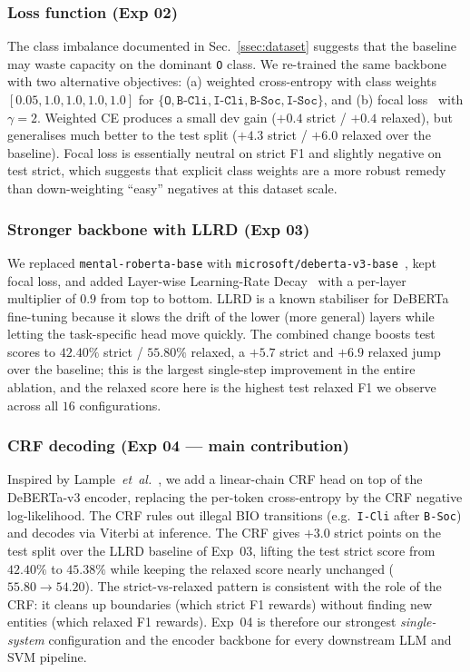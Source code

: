 \documentclass[journal]{IEEEtran}
\begin{document}
\subsubsection{Loss function (Exp 02)}
The class imbalance documented in Sec.~\ref{ssec:dataset} suggests
that the baseline may waste capacity on the dominant \texttt{O}
class. We re-trained the same backbone with two alternative
objectives: (a) weighted cross-entropy with class weights
$[0.05, 1.0, 1.0, 1.0, 1.0]$ for $\{\texttt{O},
\texttt{B-Cli}, \texttt{I-Cli}, \texttt{B-Soc}, \texttt{I-Soc}\}$, and
(b) focal loss~\cite{lin2017focal} with $\gamma{=}2$. Weighted CE
produces a small dev gain ($+0.4$ strict / $+0.4$ relaxed), but
generalises much better to the test split ($+4.3$ strict / $+6.0$
relaxed over the baseline). Focal loss is essentially neutral on
strict F1 and slightly negative on test strict, which suggests that
explicit class weights are a more robust remedy than down-weighting
``easy'' negatives at this dataset scale.

\subsubsection{Stronger backbone with LLRD (Exp 03)}
We replaced \texttt{mental-roberta-base} with
\texttt{microsoft/deberta-v3-base}~\cite{he2023debertav3}, kept focal
loss, and added Layer-wise Learning-Rate Decay~\cite{howard2018ulmfit}
with a per-layer multiplier of $0.9$ from top to bottom. LLRD is a
known stabiliser for DeBERTa fine-tuning because it slows the drift
of the lower (more general) layers while letting the task-specific
head move quickly. The combined change boosts test scores to
$42.40\%$ strict / $55.80\%$ relaxed, a $+5.7$ strict and $+6.9$
relaxed jump over the baseline; this is the largest single-step
improvement in the entire ablation, and the relaxed score here is the
highest test relaxed F1 we observe across all $16$ configurations.

\subsubsection{CRF decoding (Exp 04 --- main contribution)}
\label{sssec:exp04}
Inspired by Lample~\emph{et~al.}~\cite{lample2016neural}, we add a
linear-chain CRF head on top of the DeBERTa-v3 encoder, replacing the
per-token cross-entropy by the CRF negative log-likelihood. The CRF
rules out illegal BIO transitions (e.g.\ \texttt{I-Cli} after
\texttt{B-Soc}) and decodes via Viterbi at inference. The CRF gives
$+3.0$ strict points on the test split over the LLRD baseline of
Exp~03, lifting the test strict score from $42.40\%$ to $45.38\%$
while keeping the relaxed score nearly unchanged ($55.80 \rightarrow
54.20$). The strict-vs-relaxed pattern is consistent with the role of
the CRF: it cleans up boundaries (which strict F1 rewards) without
finding new entities (which relaxed F1 rewards). Exp~04 is therefore
our strongest \emph{single-system} configuration and the encoder
backbone for every downstream LLM and SVM pipeline.
\end{document}
